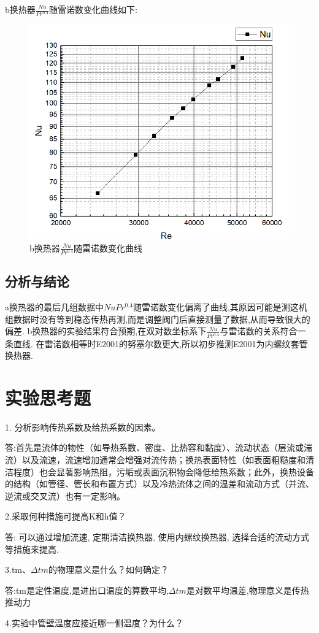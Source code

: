 \documentclass[a4paper,UTF8]{ctexrep}
\theoremstyle{plain}
\theoremstyle{definition}
\numberwithin{equation}{chapter}
\begin{document}
b换热器$\frac{Nu}{Pr^{0.4}}$随雷诺数变化曲线如下:
\begin{figure}[h]
    \centering
    \includegraphics[width=0.6\linewidth]{imwdqage.png}
    \caption{b换热器$\frac{Nu}{Pr^{0.4}}$随雷诺数变化曲线}
    \label{fig:enter-label}
\end{figure}
\subsection{分析与结论}
a换热器的最后几组数据中${Nu}{Pr^{0.4}}$随雷诺数变化偏离了曲线,其原因可能是测这机组数据时没有等到稳态传热再测,而是调整阀门后直接测量了数据,从而导致很大的偏差. b换热器的实验结果符合预期,在双对数坐标系下$\frac{Nu}{Pr^{0.4}}$与雷诺数的关系符合一条直线. 在雷诺数相等时E2001的努塞尔数更大,所以初步推测E2001为内螺纹套管换热器. 

        \section{实验思考题}
	1. 分析影响传热系数及给热系数的因素。

    答:首先是流体的物性（如导热系数、密度、比热容和黏度）、流动状态（层流或湍流）以及流速，流速增加通常会增强对流传热；换热表面特性（如表面粗糙度和清洁程度）也会显著影响热阻，污垢或表面沉积物会降低给热系数；此外，换热设备的结构（如管径、管长和布置方式）以及冷热流体之间的温差和流动方式（并流、逆流或交叉流）也有一定影响。

    2.采取何种措施可提高K和h值？

    答: 可以通过增加流速, 定期清洁换热器, 使用内螺纹换热器, 选择合适的流动方式等措施来提高.

    3.tm、$\Delta tm$的物理意义是什么？如何确定？

    
    答:tm是定性温度,是进出口温度的算数平均,$\Delta tm$是对数平均温差,物理意义是传热推动力

    4.实验中管壁温度应接近哪一侧温度？为什么？
\end{document}

